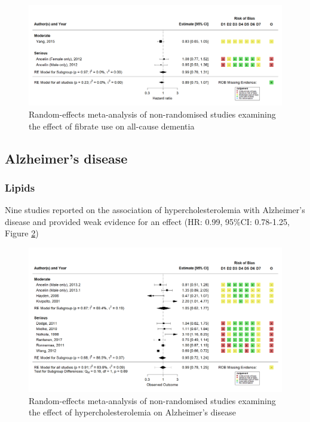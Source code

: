 \documentclass[a4paper, twoside]{templates/ociamthesis}
\begin{document}
\begin{figure}[H]
\includegraphics[width=1\linewidth]{figures/sys-rev/fp_obs_Fibrate_Dementia} \caption[Random-effects meta-analysis of statins on all-cause dementia]{Random-effects meta-analysis of non-randomised studies examining the effect of fibrate use on all-cause dementia}\label{fig:obsFibrateDementiaFig}
\end{figure}

\hypertarget{sys-rev-res-AD}{%
\subsection{Alzheimer's disease}\label{sys-rev-res-AD}}

\hypertarget{lipids-1}{%
\subsubsection{Lipids}\label{lipids-1}}

Nine studies reported on the association of hypercholesterolemia with Alzheimer's disease and provided weak evidence for an effect (HR: 0.99, 95\%CI: 0.78-1.25, Figure \ref{fig:obsHyperAD})





\begin{figure}[H]
\includegraphics[width=1\linewidth]{figures/sys-rev/fp_obs_hyperchol_AD} \caption[Meta-analysis of hypercholesterolemia on Alzheimer's disease]{Random-effects meta-analysis of non-randomised studies examining the effect of hypercholesterolemia on Alzheimer's disease}\label{fig:obsHyperAD}
\end{figure}
\end{document}
